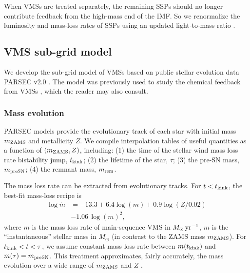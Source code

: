 \documentclass[twocolumn]{aastex631}
\begin{document}
When VMSs are treated separately, the remaining SSPs should no longer contribute feedback from the high-mass end of the IMF. So we renormalize the luminosity and mass-loss rates of SSPs using an updated light-to-mass ratio \citep[similar to][]{GuszejnovHopkinsMa_2017MNRAS.472.2107G}.


\subsection{VMS sub-grid model}
\label{sec:method:singe_star_feedback}

We develop the sub-grid model of VMSs based on public stellar evolution data PARSEC v2.0 \citep{NguyenCostaGirardi_2022A&A...665A.126N,CostaShepherdBressan_2025A&A...694A.193C}. The model was previously  used to study the chemical feedback from VMSs \citep{ShiDaiMurray_2026ApJ...997..309S}, which the reader may also consult.

\subsubsection{Mass evolution}
\label{sec:method:singe_star_feedback:mass}


PARSEC models provide the evolutionary track of each star with initial mass $m_{\rm ZAMS}$ and metallicity $Z$. We compile interpolation tables of useful quantities as a function of $(m_{\rm ZAMS}, Z)$, including: (1) the time of the {stellar wind mass loss rate} bistability jump, $t_{\rm kink}$; (2) the lifetime of the star, $\tau$; (3) the pre-SN mass, $m_{\rm preSN}$; (4) the remnant mass, $m_{\rm rem}$. 

The mass loss rate can be extracted from evolutionary tracks. For $t<t_{\rm kink}$, the best-fit mass-loss recipe is 
\begin{align}
    \log \dot m & = -13.3 + 6.4 \log(m) + 0.9 \log(Z/0.02) \nonumber \\ & -1.06\,\log(m)^2, \label{equ:wind_mass_loss_rate}
\end{align}
where $\dot m$ is the mass loss rate of main-sequence VMS in $M_\odot\,{\rm yr}^{-1}$, $m$ is the ``instantaneous'' stellar mass in $M_\odot$ (in contrast to the ZAMS mass $m_{\rm ZAMS}$). For $t_{\rm kink}<t<\tau$, we assume constant mass loss rate between $m(t_{\rm kink})$ and $m(\tau) = m_{\rm preSN}$. This treatment approximates, fairly accurately, the mass evolution over a wide range of $m_{\rm ZAMS}$ and $Z$ \citep[see Figure~4 of][]{ShiDaiMurray_2026ApJ...997..309S}.
\end{document}
